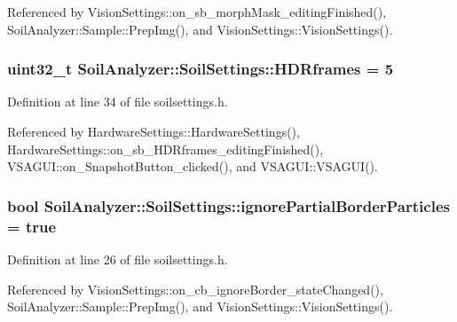 Referenced by Vision\+Settings\+::on\+\_\+sb\+\_\+morph\+Mask\+\_\+editing\+Finished(), Soil\+Analyzer\+::\+Sample\+::\+Prep\+Img(), and Vision\+Settings\+::\+Vision\+Settings().

\hypertarget{class_soil_analyzer_1_1_soil_settings_a77e631ff44efe74762b5adaa2eb2cd11}{}
\subsubsection[{H\+D\+Rframes}]{\setlength{\rightskip}{0pt plus 5cm}uint32\+\_\+t Soil\+Analyzer\+::\+Soil\+Settings\+::\+H\+D\+Rframes = 5}\label{class_soil_analyzer_1_1_soil_settings_a77e631ff44efe74762b5adaa2eb2cd11}


Definition at line 34 of file soilsettings.\+h.



Referenced by Hardware\+Settings\+::\+Hardware\+Settings(), Hardware\+Settings\+::on\+\_\+sb\+\_\+\+H\+D\+Rframes\+\_\+editing\+Finished(), V\+S\+A\+G\+U\+I\+::on\+\_\+\+Snapshot\+Button\+\_\+clicked(), and V\+S\+A\+G\+U\+I\+::\+V\+S\+A\+G\+U\+I().

\hypertarget{class_soil_analyzer_1_1_soil_settings_a24fb1d7da2247da77a17d853ea1494d7}{}
\subsubsection[{ignore\+Partial\+Border\+Particles}]{\setlength{\rightskip}{0pt plus 5cm}bool Soil\+Analyzer\+::\+Soil\+Settings\+::ignore\+Partial\+Border\+Particles = true}\label{class_soil_analyzer_1_1_soil_settings_a24fb1d7da2247da77a17d853ea1494d7}


Definition at line 26 of file soilsettings.\+h.



Referenced by Vision\+Settings\+::on\+\_\+cb\+\_\+ignore\+Border\+\_\+state\+Changed(), Soil\+Analyzer\+::\+Sample\+::\+Prep\+Img(), and Vision\+Settings\+::\+Vision\+Settings().

\hypertarget{class_soil_analyzer_1_1_soil_settings_aa4d3ed8c1ab6551bfa4763e8a1ffc148}{}
